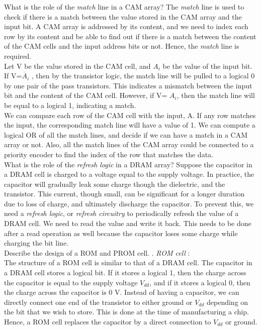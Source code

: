 \begin{ExerciseList}
\Exercise
What is the role of the {\em match} line in a CAM array?
\Answer
The {\em match} line is used to check if there is a match between the value stored in the CAM array and the input bit. A CAM array is addressed by its content, and we need to index each row by its content and be able to find out if there is a match between the content of the CAM cells and the input address bits or not. Hence, the {\em match} line is required. \\
Let V be the value stored in the CAM cell, and $A_i$ be the value of the input bit. If V=$\overline A_i$ , then by the transistor logic, the match line will be pulled to a logical 0 by one pair of the pass transistors. This indicates a mismatch between the input bit and the content of the CAM cell. However, if V= $A_i$, then the match line will be equal to a logical 1, indicating a match. \\
We can compare each row of the CAM cell with the input, A. If any row matches the input, the corresponding match line will have a value of 1. We can compute a logical OR of all the match lines, and decide if we can have a match in a CAM array or not. Also, all the match lines of the CAM array could be connected to a priority encoder to find the index of the row that matches the data. \\
\Exercise
What is the role of the {\em refresh logic} in a DRAM array?
\Answer
Suppose the capacitor in a DRAM cell is charged to a voltage equal to the supply voltage. In practice, the capacitor will gradually leak some charge though the dielectric, and the transistor. This current, though small, can be significant for a longer duration due to loss of charge, and ultimately discharge the capacitor. To prevent this, we need a {\em refresh logic}, or {\em refresh circuitry} to periodically refresh the value of a DRAM cell. We need to read the value and write it back. This needs to be done after a read operation as well because the capacitor loses some charge while charging the bit line. \\ 
\Exercise
Describe the design of a ROM and PROM cell.
. \textit{ROM cell} : \\
The structure of a ROM cell is similar to that of a DRAM cell. The capacitor in a DRAM cell stores a logical bit. If it stores a logical 1, then the charge across the capacitor is equal to the supply voltage $V_{dd}$, and if it stores a logical 0, then the charge across the capacitor is 0 V. Instead of having a capacitor, we can directly connect one end of the transistor to either ground or $V_{dd}$ depending on the bit that we wish to store. This is done at the time of manufacturing a chip. Hence, a ROM cell replaces the capacitor by a direct connection to $V_{dd}$ or ground. \\ \\

\end{ExerciseList}
